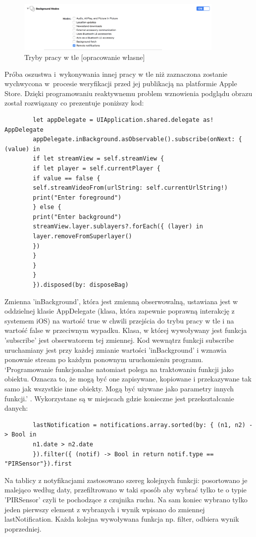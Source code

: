 \documentclass[polish,bachelor,a4paper,oneside]{ppfcmthesis}
\begin{document}
    \begin{figure}[H]
        \centering
        \includegraphics[width=10cm]{ios_screenshots/backgroundModes.png}
        \caption{Tryby pracy w tle [opracowanie własne]}
    \end{figure}
    Próba oszustwa i~wykonywania innej pracy w tle niż zaznaczona zostanie wychwycona w~procesie weryfikacji przed jej publikacją na platformie Apple Store. Dzięki programowaniu reaktywnemu problem wznowienia podglądu obrazu został rozwiązany co prezentuje poniższy kod:
    \begin{verbatim}
        let appDelegate = UIApplication.shared.delegate as! AppDelegate
        appDelegate.inBackground.asObservable().subscribe(onNext: { (value) in
        if let streamView = self.streamView {
        if let player = self.currentPlayer {
        if value == false {
        self.streamVideoFrom(urlString: self.currentUrlString!)
        print("Enter foreground")
        } else {
        print("Enter background")
        streamView.layer.sublayers?.forEach({ (layer) in
        layer.removeFromSuperlayer()
        })
        }
        }
        }
        }).disposed(by: disposeBag)
    \end{verbatim}
    Zmienna 'inBackground', która jest zmienną obserwowalną, ustawiana jest w oddzielnej klasie AppDelegate (klasa, która zapewnie poprawną interakcję z systemem iOS) na wartość true w chwili przejścia do trybu pracy w tle i na wartość false w przeciwnym wypadku. Klasa, w której wywoływany jest funkcja 'subscribe' jest obserwatorem tej zmiennej. Kod wewnątrz funkcji subscribe uruchamiany jest przy każdej zmianie wartości 'inBackground' i wznawia ponownie stream po każdym ponownym uruchomieniu programu.
    `Programowanie funkcjonalne natomiast polega na traktowaniu funkcji jako obiektu. Oznacza to, że mogą być one zapisywane, kopiowane i przekazywane tak samo jak wszystkie inne obiekty. Mogą być używane jako parametry innych funkcji.' \cite[p.~172]{proswift}. Wykorzystane są w miejscach gdzie konieczne jest przekształcanie danych:
    \begin{verbatim}
        lastNotification = notifications.array.sorted(by: { (n1, n2) -> Bool in
        n1.date > n2.date
        }).filter({ (notif) -> Bool in return notif.type == "PIRSensor"}).first
    \end{verbatim}
    Na tablicy z notyfikacjami zastosowano szereg kolejnych funkcji: posortowano je malejąco według daty, przefiltrowano w taki sposób aby wybrać tylko te o typie 'PIRSensor' czyli te pochodzące z czujnika ruchu. Na sam koniec wybrano tylko jeden pierwszy element z wybranych i wynik wpisano do zmiennej lastNotification. Każda kolejna wywoływana funkcja np. filter, odbiera wynik poprzedniej.
\end{document}
